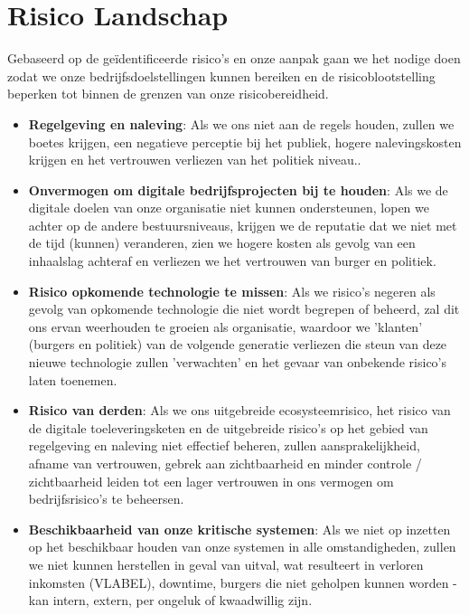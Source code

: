\documentclass[11pt]{article}
\begin{document}
\section{Risico Landschap}
\label{sec:org5ae9ab8}
Gebaseerd op de geïdentificeerde risico's en onze aanpak gaan we het nodige doen zodat we onze bedrijfsdoelstellingen kunnen bereiken en de risicoblootstelling beperken tot binnen de grenzen van 
onze risicobereidheid.
\begin{itemize}
\item \textbf{Regelgeving en naleving}: Als we ons niet aan de regels houden, zullen we boetes krijgen, een negatieve perceptie bij het publiek, hogere nalevingskosten krijgen en het vertrouwen verliezen van het politiek niveau..
\item \textbf{Onvermogen om digitale bedrijfsprojecten bij te houden}: Als we de digitale doelen van onze organisatie niet kunnen ondersteunen, lopen we achter op de andere bestuursniveaus, krijgen we de reputatie dat we niet met de tijd (kunnen) veranderen, zien we hogere kosten als gevolg van een inhaalslag achteraf en verliezen we het vertrouwen van burger en politiek.
\item \textbf{Risico opkomende technologie te missen}: Als we risico's negeren als gevolg van opkomende technologie die niet wordt begrepen of beheerd, zal dit ons ervan weerhouden te groeien als organisatie, waardoor we 'klanten' (burgers en politiek) van de volgende generatie verliezen die steun van deze nieuwe technologie zullen 'verwachten' en het gevaar van onbekende risico's laten toenemen.
\item \textbf{Risico van derden}: Als we ons uitgebreide ecosysteemrisico, het risico van de digitale toeleveringsketen en de uitgebreide risico's op het gebied van regelgeving en naleving niet effectief beheren, zullen aansprakelijkheid, afname van vertrouwen, gebrek aan zichtbaarheid en minder controle / zichtbaarheid leiden tot een lager vertrouwen in ons vermogen om bedrijfsrisico's te beheersen.
\item \textbf{Beschikbaarheid van onze kritische systemen}: Als we niet op inzetten op het beschikbaar houden van onze systemen in alle omstandigheden, zullen we niet kunnen herstellen in geval van uitval, wat resulteert in verloren inkomsten (VLABEL), downtime, burgers die niet geholpen kunnen worden - kan intern, extern, per ongeluk of kwaadwillig zijn.
\end{itemize}
\end{document}
